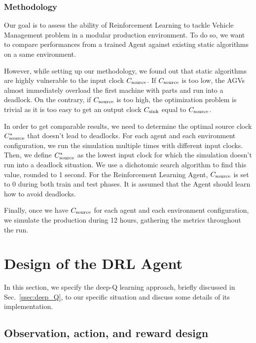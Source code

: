 \documentclass[sn-mathphys]{sn-jnl}
\begin{document}
\subsubsection{Methodology}

Our goal is to assess the ability of Reinforcement Learning to tackle Vehicle Management problem in a modular production environment. To do so, we want to compare performances from a trained Agent against existing static algorithms on a same environment.

However, while setting up our methodology, we found out that static algorithms are highly vulnerable to the input clock $C_{\rm source}$. If $C_{\rm source}$ is too low, the AGVs almost immediately overload the first machine with parts and run into a deadlock. On the contrary, if $C_{\rm source}$ is too high, the optimization problem is trivial as it is too easy to get an output clock $C_{\rm sink}$ equal to $C_{\rm source}$.

In order to get comparable results, we need to determine the optimal source clock $C_{\rm source}^*$ that doesn't lead to deadlocks. For each agent and each environment configuration, we run the simulation multiple times with different input clocks. Then, we define $C_{\rm source}^*$ as the lowest input clock for which the simulation doesn't run into a deadlock situation. We use a dichotomic search algorithm to find this value, rounded to 1 second. For the Reinforcement Learning Agent, $C_{\rm source}$ is set to $0$ during both train and test phases. It is assumed that the Agent should learn how to avoid deadlocks.

Finally, once we have $C_{\rm source}$ for each agent and each environment configuration, we simulate the production during 12 hours, gathering the metrics throughout the run.

\section{Design of the DRL Agent}
\label{sec:design_DRLagent}

In this section, we specify the deep-Q learning approach, briefly discussed in Sec.~\ref{ssec:deep_Q}, to our specific situation and discuss some details of its implementation.


\subsection{Observation, action, and reward design}
\label{ssec:observation_action_reward}
\end{document}
